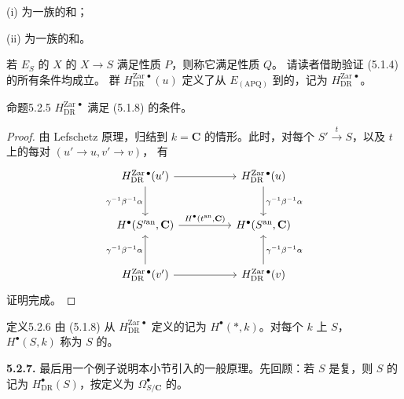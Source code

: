 (i) 为一族的和；

(ii) 为一族的和。

若 $E_S$ 的 $X$ 的 $X\to S$ 满足性质 $P$，则称它满足性质 $Q$。
请读者借助验证 (5.1.4) 的所有条件均成立。
群 $H_{\mathrm{DR}}^{\mathrm{Zar}\,\bullet}(u)$ 定义了从 $E_{(\mathrm{APQ})}$ 到的，记为 $H_{\mathrm{DR}}^{\mathrm{Zar}\,\bullet}$。
\begin{SGAresult}{命题}{5.2.5}
 $H_{\mathrm{DR}}^{\mathrm{Zar}\,\bullet}$ 满足 (5.1.8) 的条件。
\end{SGAresult}
\begin{proof}
由 Lefschetz 原理，归结到 $k=\mathbf C$ 的情形。此时，对每个 $S'\xrightarrow{t}S$，以及 $t$ 上的每对 $(u'\to u,v'\to v)$，
有
\[
\begin{tikzcd}[column sep=huge,row sep=large]
H_{\mathrm{DR}}^{\mathrm{Zar}\,\bullet}(u')\arrow[r]\arrow[d,"\gamma^{-1}\beta^{-1}\alpha"']&H_{\mathrm{DR}}^{\mathrm{Zar}\,\bullet}(u)\arrow[d,"\gamma^{-1}\beta^{-1}\alpha"]\\
H^\bullet(S'^{\mathrm{an}},\mathbf C)\arrow[r,"{H^\bullet(t^{\mathrm{an}},\mathbf C)}"]&H^\bullet(S^{\mathrm{an}},\mathbf C)\\
H_{\mathrm{DR}}^{\mathrm{Zar}\,\bullet}(v')\arrow[r]\arrow[u,"\gamma^{-1}\beta^{-1}\alpha"]&H_{\mathrm{DR}}^{\mathrm{Zar}\,\bullet}(v)\arrow[u,"\gamma^{-1}\beta^{-1}\alpha"']
\end{tikzcd}
\]
证明完成。
\end{proof}
\begin{SGAresult}{定义}{5.2.6}
由 (5.1.8) 从 $H_{\mathrm{DR}}^{\mathrm{Zar}\,\bullet}$ 定义的记为 $H^\bullet(*,k)$。对每个 $k$ 上 $S$， $H^\bullet(S,k)$ 称为 $S$ 的。
\end{SGAresult}
\textbf{5.2.7.} 最后用一个例子说明本小节引入的一般原理。先回顾：若 $S$ 是复，则 $S$ 的记为 $H_{\mathrm{DR}}^\bullet(S)$，按定义为 $\Omega_{S/\mathbf C}^\bullet$ 的。
